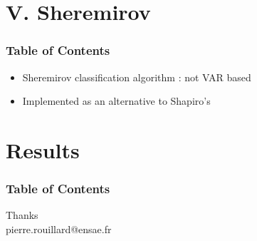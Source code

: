 \documentclass[9pt, xcolor={dvipsnames}]{beamer}
\begin{document}
\section{V. Sheremirov}
\begin{frame}
  \frametitle{Table of Contents}
  \tableofcontents[currentsection]
\end{frame}
\begin{frame}
  \begin{itemize}
    \item Sheremirov classification algorithm : not VAR based
    \item Implemented as an alternative to Shapiro's
  \end{itemize}
\end{frame}

\section{Results}
\begin{frame}
  \frametitle{Table of Contents}
  \tableofcontents[currentsection]
\end{frame}

\begin{frame}
 \begin{center}
		{\Huge Thanks}\\
		\bigskip\bigskip %
		{\LARGE pierre.rouillard@ensae.fr}
	\end{center}
\end{frame}
\end{document}
